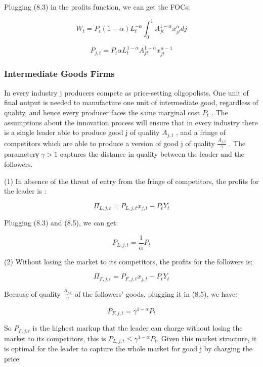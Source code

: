 \documentclass[10pt,math=newtx,citestyle=gb7714-2015,bibstyle=gb7714-2015]{elegantbook}
\begin{document}
{{{	Plugging (8.3) in the profits function, we can get the FOCs:
	
	\begin{equation}
		W_t = P_t (1-\alpha)L_{t}^{-\alpha} \int_{0}^{1} A_{j t}^{1-\alpha} x_{j t}^{\alpha} d j
	\end{equation}
		
		\begin{equation}
		P_{j,t} = P_t \alpha L_{t}^{1-\alpha} A_{j t}^{1-\alpha} x_{j t}^{\alpha-1}
	\end{equation}
		
	\subsubsection{Intermediate Goods Firms}
	
	In every industry j producers compete as price-setting oligopolists. One unit of final output is needed to manufacture one unit of intermediate good, regardless of quality, and hence every producer faces the same marginal cost $P_t$ . The assumptions about the innovation process will ensure that in every industry there is a single leader able to produce good j of quality $A_{j,t}$ , and a fringe of competitors which are able to produce a version of good j of quality $\frac{A_{j,t}}{\gamma}$ . The parameterγ $\gamma>1$ captures the distance in quality between the leader and the followers.
	
	(1) In absence of the threat of entry from the fringe of competitors, the profits for the leader is :
	
	$$\Pi_{L,j,t} = P_{L,j,t} x_{j,t} - P_t Y_t$$
	
	Plugging (8.3) and (8.5), we can get:
	
	\begin{equation}
		P_{L,j,t} = \frac{1}{\alpha} P_t
	\end{equation}
	
	(2) Without losing the market to its competitors, the profits for the followers is:
	
		$$\Pi_{F,j,t} = P_{F,j,t} x_{j,t} - P_t Y_t$$
	
	Because of  quality $\frac{A_{j,t}}{\gamma}$ of the followers' goods, plugging it in (8.5), we have:
	
		\begin{equation}
		P_{F,j,t} = \gamma^{1-\alpha}P_t
	\end{equation}
	
	So $P_{F,j,t}$ is the highest markup that the leader can charge without losing the market to its competitors, this is $P_{L,j,t}  \le \gamma^{1-\alpha}P_t$. Given this market structure, it is optimal for the leader to capture the whole market for good j by charging the price:
	
}}}
\end{document}
